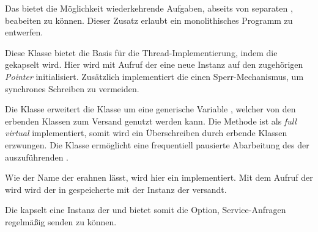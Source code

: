 
Das  bietet die Möglichkeit wiederkehrende Aufgaben, abseits von separaten \Node[s], beabeiten zu können. Dieser Zusatz erlaubt ein monolithisches Programm zu entwerfen.


Diese Klasse bietet die Basis für die Thread-Implementierung, indem die  gekapselt wird. Hier wird mit Aufruf der  eine neue Instanz auf den zugehörigen \textit{Pointer} initialisiert. Zusätzlich implementiert die  einen Sperr-Mechanismus, um synchrones Schreiben zu vermeiden. 


Die Klasse  erweitert die Klasse  um eine generische Variable , welcher von den erbenden Klassen zum Versand genutzt werden kann. Die Methode  ist als \textit{full virtual} implementiert, somit wird ein Überschreiben durch erbende Klassen erzwungen. Die Klasse  ermöglicht eine frequentiell pausierte Abarbeitung des der auszuführenden .



Wie der Name der  erahnen lässt, wird hier ein  implementiert. Mit dem Aufruf der  wird wird der in  gespeicherte  mit der Instanz der  versandt.


Die  kapselt eine Instanz der  und bietet somit die Option, Service-Anfragen regelmäßig senden zu können.